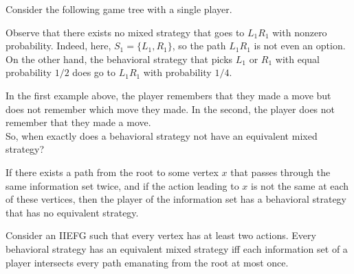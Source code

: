 	\begin{fex}
		Consider the following game tree with a single player.
		\begin{center}
		\end{center}
		Observe that there exists no mixed strategy that goes to $L_1R_1$ with nonzero probability. Indeed, here, $S_1 = \{L_1,R_1\}$, so the path $L_1R_1$ is not even an option. \\
		On the other hand, the behavioral strategy that picks $L_1$ or $R_1$ with equal probability $1/2$ does go to $L_1R_1$ with probability $1/4$.
	\end{fex}

	In the first example above, the player remembers that they made a move but does not remember which move they made. In the second, the player does not remember that they made a move.\\

	So, when exactly does a behavioral strategy not have an equivalent mixed strategy?

	\begin{flem}
		If there exists a path from the root to some vertex $x$ that passes through the same information set twice, and if the action leading to $x$ is not the same at each of these vertices, then the player of the information set has a behavioral strategy that has no equivalent strategy.
	\end{flem}

	\begin{ftheo}
		\label{theo: behavioral has equivalent mixed}
		Consider an IIEFG such that every vertex has at least two actions. Every behavioral strategy has an equivalent mixed strategy iff each information set of a player intersects every path emanating from the root at most once.
	\end{ftheo}

